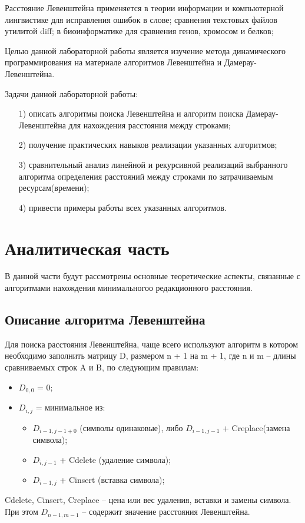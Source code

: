 \documentclass[a4paper,12pt]{article}
\begin{document}
\hfill

Расстояние Левенштейна применяется в теории информации и компьютерной лингвистике для исправления ошибок в слове; сравнения текстовых файлов утилитой diﬀ; в биоинформатике для сравнения генов, хромосом и белков;

\hfill

Целью данной лабораторной работы является изучение метода динамического программирования на материале алгоритмов Левенштейна и Дамерау-Левенштейна.

\hfill

Задачи данной лабораторной работы: 
\begin{enumerate} 
	\item[1)] описать алгоритмы поиска Левенштейна и алгоритм поиска Дамерау-Левенштейна для нахождения расстояния между строками; 
	\item[2)] получение практических навыков реализации указанных алгоритмов;
	\item[3)] сравнительный анализ линейной и рекурсивной реализаций выбранного алгоритма определения расстояний между строками по затрачиваемым ресурсам(времени);
	\item[4)] привести примеры работы всех указанных алгоритмов.
\end{enumerate} 

\newpage
\section{Аналитическая часть}
\hfill
В данной части будут рассмотрены основные теоретические аспекты, связанные с алгоритмами нахождения минимальногоо редакционного расстояния.

\subsection{Описание алгоритма Левенштейна}
\textbf{\qquad}Для поиска расстояния Левенштейна, чаще всего используют
алгоритм в котором необходимо заполнить матрицу D, размером n + 1
на m + 1, где n и m – длины сравниваемых строк A и B, по следующим
правилам:
\begin{itemize}
	\item {$D_{0,0}$} = 0;
	
	\item {$D_{i,j}$} = минимальное из:
	
	\begin{itemize}
		
		\item {$D_{i-1,j-1 + 0}$} (символы одинаковые),
		либо {$D_{i-1,j-1}$} + Creplace(замена символа);
		
		\item {$D_{i,j-1}$} + Cdelete (удаление символа);
		
		\item {$D_{i-1,j}$} + Cinsert (вставка символа);
		
	\end{itemize}
	
\end{itemize}
Cdelete, Cinsert, Creplace – цена или вес удаления, вставки и замены символа. При этом {$D_{n-1,m-1}$} – содержит значение расстояния Левенштейна.
\end{document}
